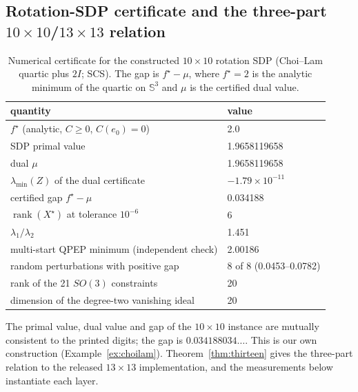 \subsection{Rotation-SDP certificate and the three-part \texorpdfstring{$10\times10$/$13\times13$}{10x10/13x13} relation}\label{sec:results_sdp}

\begin{table}[t]
\centering
\caption{Numerical certificate for the constructed $10\times10$ rotation SDP (Choi--Lam quartic plus $2I$; SCS). The gap is $f^\star-\mu$, where $f^\star=2$ is the analytic minimum of the quartic on $\mathbb{S}^3$ and $\mu$ is the certified dual value.}
\label{tab:sdp_cert}
\scriptsize
\setlength{\tabcolsep}{3pt}
\begin{tabular}{@{}p{4.6cm} l@{}}
\toprule
quantity & value\\
\midrule
$f^\star$ (analytic, $C\ge0$, $C(e_0)=0$) & 2.0\\
SDP primal value & 1.9658119658\\
dual $\mu$ & 1.9658119658\\
$\lambda_{\min}(Z)$ of the dual certificate & $-1.79\times10^{-11}$\\
certified gap $f^\star-\mu$ & 0.034188\\
$\operatorname{rank}(X^\star)$ at tolerance $10^{-6}$ & 6\\
$\lambda_1/\lambda_2$ & 1.451\\
multi-start QPEP minimum (independent check) & 2.00186\\
random perturbations with positive gap & 8 of 8 (0.0453--0.0782)\\
rank of the 21 $SO(3)$ constraints & 20\\
dimension of the degree-two vanishing ideal & 20\\
\bottomrule
\end{tabular}
\end{table}

The primal value, dual value and gap of the $10\times10$ instance are mutually consistent to the printed digits; the gap is $0.034188034\ldots$. This is our own construction (Example~\ref{ex:choilam}). Theorem~\ref{thm:thirteen} gives the three-part relation to the released $13\times13$ implementation, and the measurements below instantiate each layer.

